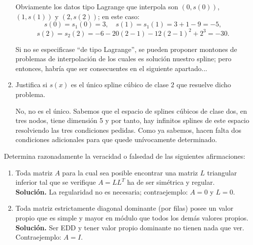 \documentclass[12pt]{article}
\begin{document}
\begin{ejercicio}
\begin{enumerate}[label=\alph*)]
				Obviamente los datos tipo Lagrange que interpola son $(0, s(0))$, $(1, s(1))$ y $(2, s(2))$; en este caso:  
				$$s(0) = s_1(0) = 3, \quad s(1) = s_1(1) = 3 + 1 - 9 = -5,$$
				$$ s(2) = s_2(2) = -6 - 20(2 - 1) - 12(2 - 1)^2 + 2^3 = -30.$$
				
				Si no se especificase “de tipo Lagrange”, se pueden proponer montones de problemas de interpolación de  
				los cuales es solución nuestro spline; pero entonces, habría que ser consecuentes en el siguiente apartado...
			
			\item Justifica si $s(x)$ es el único spline cúbico de clase $2$ que resuelve dicho problema.
			
				No, no es el único. Sabemos que el espacio de splines cúbicos de clase dos, en tres nodos, tiene
				dimensión 5 y por tanto, hay infinitos splines de este espacio resolviendo las tres condiciones pedidas. Como
				ya sabemos, hacen falta dos condiciones adicionales para que quede unívocamente determinado.
		\end{enumerate}
	\end{ejercicio}
	
	\begin{ejercicio}
		Determina razonadamente la veracidad o falsedad de las siguientes afirmaciones:
		\begin{enumerate}[label=\alph*)]
			\item Toda matriz $A$ para la cual sea posible encontrar una matriz $L$ triangular inferior tal que se verifique $A = LL^T$ ha de ser simétrica y regular.\\
			
				\textbf{Solución. } La regularidad no es necesaria; contraejemplo: $A=0$ y $L=0$.
			
			\item Toda matriz estrictamente diagonal dominante (por filas) posee un valor propio que es simple y 
			mayor en módulo que todos los demás valores propios. \\
			
				\textbf{Solución. } Ser EDD y tener valor propio dominante no tienen nada que ver. Contraejemplo: $A=I$.
		\end{enumerate}
	\end{ejercicio}
	
\end{document}
